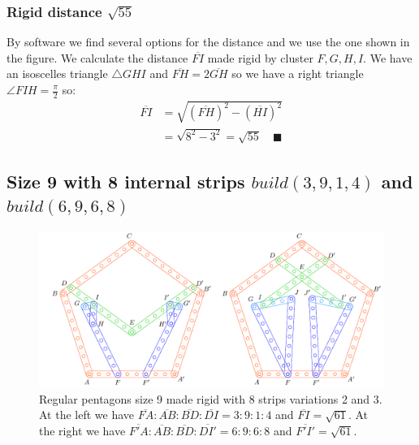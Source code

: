 \documentclass[11pt]{article}
\begin{document}
\subsubsection{Rigid distance $\sqrt{55}$}

By software we find several options for the distance and we use the one shown in the figure.
We calculate the distance $\overline{FI}$ made rigid by cluster $F,G,H,I$. We have an isoscelles triangle $\triangle{GHI}$ and $\overline{FH}=2\overline{GH}$ so we have a right triangle $\angle{FIH}=\frac{\pi}2$ so: \begin{align}
\overline{FI} &= \sqrt{(\overline{FH})^2 - (\overline{HI})^2}\nonumber\\
 &= \sqrt{8^2 - 3^2} = \sqrt{55} \quad\blacksquare
\end{align}

\subsection{Size 9 with 8 internal strips $build(3,9,1,4)$ and $build(6,9,6,8)$}

\begin{figure}[H]
 \centering
 \includegraphics[scale=0.95]{9/penta9-8b}
 \caption{Regular pentagons size 9 made rigid with 8 strips variations 2 and 3. At the left we have $\overline{FA}:\overline{AB}:\overline{BD}:\overline{DI} = 3:9:1:4$ and $\overline{FI} = \sqrt{61}$. At the right we have $\overline{F'A}:\overline{AB}:\overline{BD}:\overline{DI'} = 6:9:6:8$ and $\overline{F'I'}=\sqrt{61}$.}
 \label{fig:penta9-8b}
\end{figure}
\end{document}

